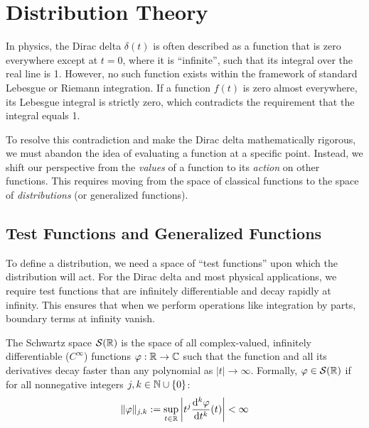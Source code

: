 \section{Distribution Theory}

In physics, the Dirac delta $\delta(t)$ is often described as a function that is zero everywhere except at $t=0$, where it is ``infinite'', such that its integral over the real line is 1. However, no such function exists within the framework of standard Lebesgue or Riemann integration. If a function $f(t)$ is zero almost everywhere, its Lebesgue integral is strictly zero, which contradicts the requirement that the integral equals 1.

To resolve this contradiction and make the Dirac delta mathematically rigorous, we must abandon the idea of evaluating a function at a specific point. Instead, we shift our perspective from the \textit{values} of a function to its \textit{action} on other functions. This requires moving from the space of classical functions to the space of \textit{distributions} (or generalized functions).

\subsection{Test Functions and Generalized Functions}

To define a distribution, we need a space of ``test functions'' upon which the distribution will act. For the Dirac delta and most physical applications, we require test functions that are infinitely differentiable and decay rapidly at infinity. This ensures that when we perform operations like integration by parts, boundary terms at infinity vanish.

\begin{definition}
The Schwartz space $\mathcal{S}(\mathbb{R})$ is the space of all complex-valued, infinitely differentiable ($C^\infty$) functions $\varphi: \mathbb{R} \to \mathbb{C}$ such that the function and all its derivatives decay faster than any polynomial as $|t| \to \infty$. Formally, $\varphi \in \mathcal{S}(\mathbb{R})$ if for all nonnegative integers $j, k \in \mathbb{N} \cup \{0\}$:
\begin{equation}
\|\varphi\|_{j,k} := \sup_{t \in \mathbb{R}} \left| t^j \frac{\mathrm{d}^k \varphi}{\mathrm{d}t^k}(t) \right| < \infty
\end{equation}

\end{definition}

